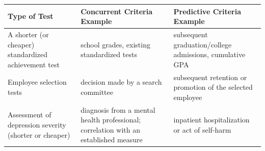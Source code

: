 \documentclass[
  english,
]{book}
\begin{document}
\begin{longtable}[]{@{}lll@{}}
\toprule
\begin{minipage}[b]{0.32\columnwidth}\raggedright
Type of Test\strut
\end{minipage} & \begin{minipage}[b]{0.30\columnwidth}\raggedright
Concurrent Criteria Example\strut
\end{minipage} & \begin{minipage}[b]{0.30\columnwidth}\raggedright
Predictive Criteria Example\strut
\end{minipage}\tabularnewline
\midrule
\endhead
\begin{minipage}[t]{0.32\columnwidth}\raggedright
A shorter (or cheaper) standardized achievement test\strut
\end{minipage} & \begin{minipage}[t]{0.30\columnwidth}\raggedright
school grades, existing standardized tests\strut
\end{minipage} & \begin{minipage}[t]{0.30\columnwidth}\raggedright
subsequent graduation/college admissions, cumulative GPA\strut
\end{minipage}\tabularnewline
\begin{minipage}[t]{0.32\columnwidth}\raggedright
Employee selection tests\strut
\end{minipage} & \begin{minipage}[t]{0.30\columnwidth}\raggedright
decision made by a search committee\strut
\end{minipage} & \begin{minipage}[t]{0.30\columnwidth}\raggedright
subsequent retention or promotion of the selected employee\strut
\end{minipage}\tabularnewline
\begin{minipage}[t]{0.32\columnwidth}\raggedright
Assessment of depression severity (shorter or cheaper)\strut
\end{minipage} & \begin{minipage}[t]{0.30\columnwidth}\raggedright
diagnosis from a mental health professional; correlation with an established measure\strut
\end{minipage} & \begin{minipage}[t]{0.30\columnwidth}\raggedright
inpatient hospitalization or act of self-harm\strut
\end{minipage}\tabularnewline
\bottomrule
\end{longtable}
\end{document}
